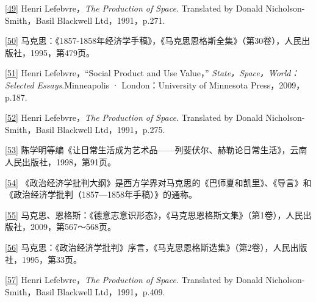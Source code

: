 \documentclass[UTF8, fontset = sourcesans, a4paper, oneside, zihao =
-4, scheme=chinese, no-math, space=true]{ctexbook}
\begin{document}
\protect\hypertarget{part0006_split_003.htmlux5cux23m49}{}{}\protect\hyperlink{part0006_split_003.htmlux5cux23w49}{{[}49{]}}
Henri Lefebvre，\emph{The Production of Space}. Translated by Donald
Nicholson-Smith，Basil Blackwell Ltd，1991，p.271.

\protect\hypertarget{part0006_split_003.htmlux5cux23m50}{}{}\protect\hyperlink{part0006_split_003.htmlux5cux23w50}{{[}50{]}}
马克思：《1857-1858年经济学手稿》，《马克思恩格斯全集》（第30卷），人民出版社，1995，第479页。

\protect\hypertarget{part0006_split_003.htmlux5cux23m51}{}{}\protect\hyperlink{part0006_split_003.htmlux5cux23w51}{{[}51{]}}
Henri Lefebvre，``Social Product and Use Value，''
\emph{State，Space，World：Selected Essays}.Minneapolis ·
London：University of Minnesota Press，2009，p.187.

\protect\hypertarget{part0006_split_003.htmlux5cux23m52}{}{}\protect\hyperlink{part0006_split_003.htmlux5cux23w52}{{[}52{]}}
Henri Lefebvre，\emph{The Production of Space}. Translated by Donald
Nicholson-Smith，Basil Blackwell Ltd，1991，p.275.

\protect\hypertarget{part0006_split_003.htmlux5cux23m53}{}{}\protect\hyperlink{part0006_split_003.htmlux5cux23w53}{{[}53{]}}
陈学明等编《让日常生活成为艺术品------列斐伏尔、赫勒论日常生活》，云南人民出版社，1998，第91页。

\protect\hypertarget{part0006_split_003.htmlux5cux23m54}{}{}\protect\hyperlink{part0006_split_003.htmlux5cux23w54}{{[}54{]}}
《政治经济学批判大纲》是西方学界对马克思的《巴师夏和凯里》、《导言》和《政治经济学批判（1857---1858年手稿）》的通称。

\protect\hypertarget{part0006_split_003.htmlux5cux23m55}{}{}\protect\hyperlink{part0006_split_003.htmlux5cux23w55}{{[}55{]}}
马克思、恩格斯：《德意志意识形态》，《马克思恩格斯文集》（第1卷），人民出版社，2009，第567～568页。

\protect\hypertarget{part0006_split_003.htmlux5cux23m56}{}{}\protect\hyperlink{part0006_split_003.htmlux5cux23w56}{{[}56{]}}
马克思：《政治经济学批判》序言，《马克思恩格斯选集》（第2卷），人民出版社，1995，第33页。

\protect\hypertarget{part0006_split_003.htmlux5cux23m57}{}{}\protect\hyperlink{part0006_split_003.htmlux5cux23w57}{{[}57{]}}
Henri Lefebvre，\emph{The Production of Space}. Translated by Donald
Nicholson-Smith，Basil Blackwell Ltd，1991，p.409.

\protect\hypertarget{part0007_split_000.html}{}{}
\end{document}
